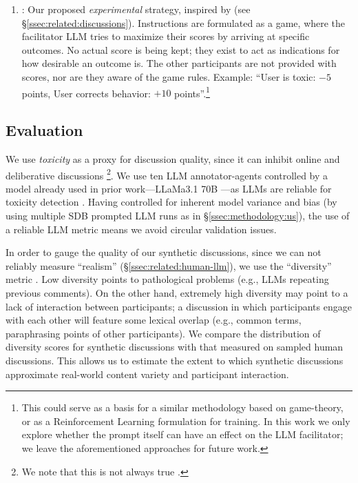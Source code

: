 \begin{enumerate}
    \item \textbf{\strategymodgame}: Our proposed \emph{experimental} strategy, inspired by \citet{abdelnabi_negotiations} (see \S\ref{ssec:related:discussions}). Instructions are formulated as a game, where the facilitator LLM tries to maximize their scores by arriving at specific outcomes. No actual score is being kept; they exist to act as indications for how desirable an outcome is. The other participants are not provided with scores, nor are they aware of the game rules. Example: ``User is toxic: $\minus5$ points, User corrects behavior: $+10$ points''.\footnote{This could serve as a basis for a similar methodology based on game-theory, or as a Reinforcement Learning formulation for training. In this work we only explore whether the prompt itself can have an effect on the LLM facilitator; we leave the aforementioned approaches for future work.}
\end{enumerate}



\subsection{Evaluation}
\label{ssec:experimental:evaluation}

We use \emph{toxicity} as a proxy for discussion quality, since it can inhibit online and deliberative discussions \citep{dekock2022disagree, XiaToxicity}\footnote{We note that this is not always true \citep{Avalle2024PersistentIP}.}. We use ten LLM annotator-agents controlled by a model already used in prior work---LLaMa3.1 70B \citep{kang-qian-2024-implanting}---as LLMs are reliable for toxicity detection \citep{Wang2022ToxicityDW, anjum2024hate}. Having controlled for inherent model variance and bias (by using multiple SDB prompted LLM runs as in \S\ref{ssec:methodology:us}), the use of a reliable LLM metric means we avoid circular validation issues.

In order to gauge the quality of our synthetic discussions, since we can not reliably measure ``realism'' (\S\ref{ssec:related:human-llm}), we use the ``diversity'' metric \citep{ulmer2024}. Low diversity points to pathological problems (e.g., LLMs repeating previous comments). On the other hand, extremely high diversity may point to a lack of interaction between participants; a discussion in which participants engage with each other will feature some lexical overlap (e.g., common terms, paraphrasing points of other participants). We compare the distribution of diversity scores for synthetic discussions with that measured on sampled human discussions. This allows us to estimate the extent to which synthetic discussions approximate real-world content variety and participant interaction. 

